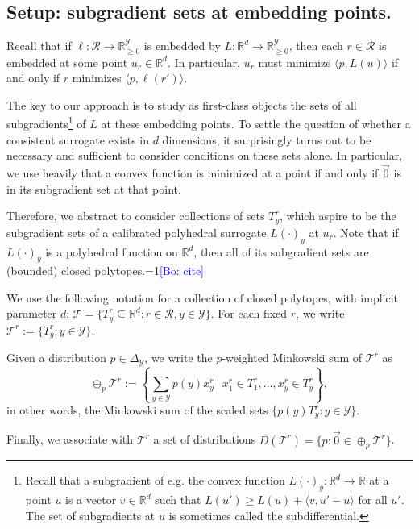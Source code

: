 \documentclass[anon]{colt2020} %
\newcommand{\Comments}{1}
\newcommand{\mynote}[2]{\ifnum\Comments=1\textcolor{#1}{#2}\fi}
\newcommand{\bo}[1]{\mynote{blue}{[Bo: #1]}}
\newcommand{\reals}{\mathbb{R}}
\newcommand{\nonnegreals}{\reals_{\geq 0}}%
\newcommand{\simplex}{\Delta_\Y}
\newcommand{\R}{\mathcal{R}}
\newcommand{\T}{\mathcal{T}}
\newcommand{\Y}{\mathcal{Y}}
\newcommand{\inprod}[2]{\langle #1, #2 \rangle}%
\begin{document}
\subsection{Setup: subgradient sets at embedding points.}\label{subsec:sub-sets}

Recall that if $\ell: \R \to \nonnegreals^{\Y}$ is embedded by $L: \reals^d \to \nonnegreals^{\Y}$, then each $r \in \R$ is embedded at some point $u_r \in \reals^d$.
In particular, $u_r$ must minimize $\inprod{p}{L(u)}$ if and only if $r$ minimizes $\inprod{p}{\ell(r')}$.

The key to our approach is to study as first-class objects the sets of all subgradients\footnote{Recall that a subgradient of e.g. the convex function $L(\cdot)_y: \reals^d \to \reals$ at a point $u$ is a vector $v \in \reals^d$ such that $L(u') \geq L(u) + \inprod{v}{u'-u}$ for all $u'$. The set of subgradients at $u$ is sometimes called the subdifferential.} of $L$ at these embedding points.
To settle the question of whether a consistent surrogate exists in $d$ dimensions, it surprisingly turns out to be necessary and sufficient to consider conditions on these sets alone.
In particular, we use heavily that a convex function is minimized at a point if and only if $\vec{0}$ is in its subgradient set at that point.

Therefore, we abstract to consider collections of sets $T^r_y$, which aspire to be the subgradient sets of a calibrated polyhedral surrogate $L(\cdot)_y$ at $u_r$.
Note that if $L(\cdot)_y$ is a polyhedral function on $\reals^d$, then all of its subgradient sets are (bounded) closed polytopes.\bo{cite}

\begin{definition}[$\T$, $\T^r$, $D(\T^r)$]
  We use the following notation for a collection of closed polytopes, with implicit parameter $d$: $\T = \{T^r_y \subseteq \reals^d : r \in \R, y \in \Y\}$.
  For each fixed $r$, we write $\T^r := \{T^r_y : y \in \Y\}$.

  Given a distribution $p \in \simplex$, we write the $p$-weighted Minkowski sum of $\T^r$ as
    \[ \oplus_p \T^r := \left\{ \sum_{y \in \Y} p(y) x^r_y ~\Big|~ x^r_1 \in T^r_1, \dots, x^r_y \in T^r_y \right\} , \]
  in other words, the Minkowski sum of the scaled sets $\{p(y) T^r_y : y \in \Y\}$.

  Finally, we associate with $\T^r$ a set of distributions $D(\T^r) = \{ p : \vec 0 \in \oplus_p \T^r\}$.
\end{definition}
\end{document}
